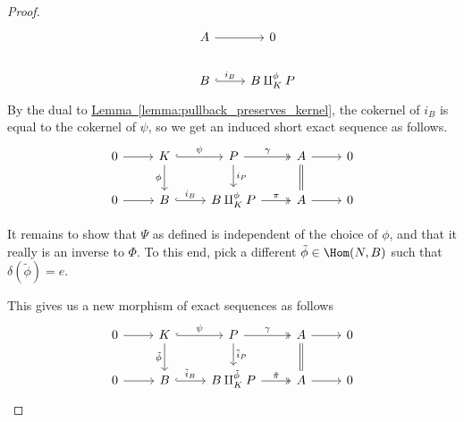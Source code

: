 \documentclass[main.tex]{subfiles}
\begin{document}
\begin{proof}
\begin{equation*}
\begin{tikzcd}
      & A
      \arrow[r]
      & 0
      \\
      & B
      \arrow[r, hook, "i_{B}"]
      & B \amalg^{\phi}_{K} P
    \end{tikzcd}
  \end{equation*}
  By the dual to \hyperref[lemma:pullback_preserves_kernel]{Lemma~\ref*{lemma:pullback_preserves_kernel}}, the cokernel of $i_{B}$ is equal to the cokernel of $\psi$, so we get an induced short exact sequence as follows.
  \begin{equation*}
    \begin{tikzcd}
      0
      \arrow[r]
      & K
      \arrow[r, hook, "\psi"]
      \arrow[d, swap, "\phi"]
      & P
      \arrow[r, two heads, "\gamma"]
      \arrow[d, "i_{P}"]
      & A
      \arrow[r]
      \arrow[d, equals]
      & 0
      \\
      0
      \arrow[r]
      & B
      \arrow[r, hook, "i_{B}"]
      & B \amalg^{\phi}_{K} P
      \arrow[r, two heads, "\pi"]
      & A
      \arrow[r]
      & 0
    \end{tikzcd}
  \end{equation*}

  It remains to show that $\Psi$ as defined is independent of the choice of $\phi$, and that it really is an inverse to $\Phi$. To this end, pick a different $\tilde{\phi} \in \Hom(N, B)$ such that $\delta(\tilde{\phi}) = e$.

  This gives us a new morphism of exact sequences as follows
  \begin{equation}
    \label{eq:exact_seq_for_phi_tilde}
    \begin{tikzcd}
      0
      \arrow[r]
      & K
      \arrow[r, hook, "\psi"]
      \arrow[d, swap, "\tilde{\phi}"]
      & P
      \arrow[r, two heads, "\gamma"]
      \arrow[d, "\tilde{i}_{P}"]
      & A
      \arrow[r]
      \arrow[d, equals]
      & 0
      \\
      0
      \arrow[r]
      & B
      \arrow[r, hook, "\tilde{i}_{B}"]
      & B \amalg^{\tilde{\phi}}_{K} P
      \arrow[r, two heads, "\tilde{\pi}"]
      & A
      \arrow[r]
      & 0
    \end{tikzcd}
  \end{equation}


\end{proof}
\end{document}
